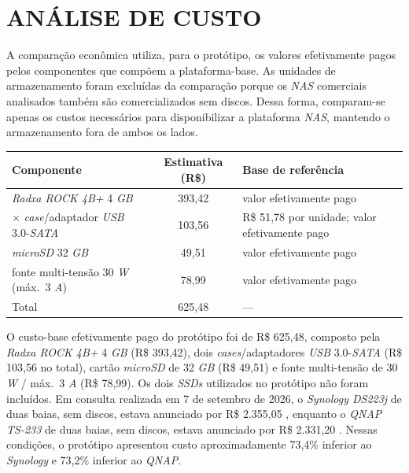 \section{ANÁLISE DE CUSTO}

A comparação econômica utiliza, para o protótipo, os valores efetivamente pagos pelos componentes que compõem a plataforma-base. As unidades de armazenamento foram excluídas da comparação porque os \textit{NAS} comerciais analisados também são comercializados sem discos. Dessa forma, comparam-se apenas os custos necessários para disponibilizar a plataforma \textit{NAS}, mantendo o armazenamento fora de ambos os lados.

\begin{table}[H]
    \centering
    \small
    \renewcommand{\arraystretch}{1.15}
    \begin{tabularx}{\linewidth}{|>{\raggedright\arraybackslash}X|c|>{\raggedright\arraybackslash}X|}
        \hline
        \textbf{Componente} & \textbf{Estimativa (R\$)} & \textbf{Base de referência} \\
        \hline
        \hline
        \textit{Radxa ROCK 4B+} 4 \textit{GB} & 393,42 & valor efetivamente pago \\
        \hline
        2 $\times$ \textit{case}/adaptador \textit{USB} 3.0-\textit{SATA} & 103,56 & R\$ 51,78 por unidade; valor efetivamente pago \\
        \hline
        \textit{microSD} 32 \textit{GB} & 49,51 & valor efetivamente pago \\
        \hline
        fonte multi-tensão 30 \textit{W} (máx.\ 3 \textit{A}) & 78,99 & valor efetivamente pago \\
        \hline
        Total & 625,48 & --- \\
        \hline
    \end{tabularx}
    \vspace{0.2cm}
    \fonteautoria
\end{table}

O custo-base efetivamente pago do protótipo foi de R\$ 625,48, composto pela \textit{Radxa ROCK 4B+} 4 \textit{GB} (R\$ 393,42), dois \textit{cases}/adaptadores \textit{USB} 3.0-\textit{SATA} (R\$ 103,56 no total), cartão \textit{microSD} de 32 \textit{GB} (R\$ 49,51) e fonte multi-tensão de 30 \textit{W} / máx.\ 3 \textit{A} (R\$ 78,99). Os dois \textit{SSDs} utilizados no protótipo não foram incluídos. Em consulta realizada em 7 de setembro de 2026, o \textit{Synology DS223j} de duas baias, sem discos, estava anunciado por R\$ 2.355,05 \cite{kabum2026synology}, enquanto o \textit{QNAP TS-233} de duas baias, sem discos, estava anunciado por R\$ 2.331,20 \cite{kabum2026qnap}. Nessas condições, o protótipo apresentou custo aproximadamente 73,4\% inferior ao \textit{Synology} e 73,2\% inferior ao \textit{QNAP}.

